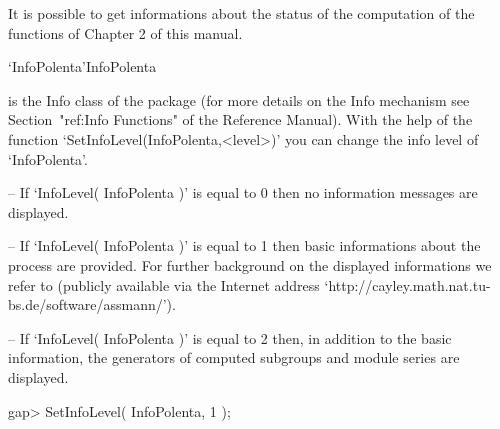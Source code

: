 
It is possible to get informations about the status of the computation of the 
functions of Chapter 2 of this manual.


\> `InfoPolenta'{InfoPolenta}
 
is the Info class of the {\Polenta} package (for more details on the Info mechanism see Section~"ref:Info Functions" of the 
{\GAP} Reference Manual). 
With the help of the function 
`SetInfoLevel(InfoPolenta,<level>)' you can change 
the info level of `InfoPolenta'. 
\beginlist
\item{--}
  If  `InfoLevel( InfoPolenta )' is equal to 0 
 then no information 
  messages are displayed. 
\item{--}
  If `InfoLevel( InfoPolenta )' is equal to 1 then basic informations
  about the process are provided. For further background on the displayed 
  informations we refer to  \cite{Assmann} (publicly available via the 
  Internet address `http://cayley.math.nat.tu-bs.de/software/assmann/').
\item{--}
  If `InfoLevel( InfoPolenta )' is equal to 2 then, in addition to the 
  basic information, the generators of computed subgroups and module series
  are displayed. 
\endlist



\beginexample
gap> SetInfoLevel( InfoPolenta, 1 );

